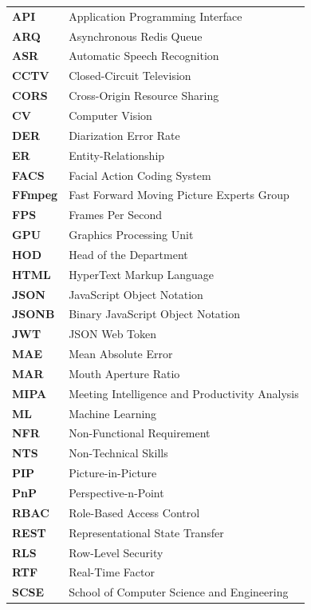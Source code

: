 \documentclass[12pt,a4paper,oneside]{report}
\begin{document}
\begin{longtable}{@{}p{3.0cm}p{11.0cm}@{}}
\textbf{API}     & Application Programming Interface \\
\textbf{ARQ}     & Asynchronous Redis Queue \\
\textbf{ASR}     & Automatic Speech Recognition \\
\textbf{CCTV}    & Closed-Circuit Television \\
\textbf{CORS}    & Cross-Origin Resource Sharing \\
\textbf{CV}      & Computer Vision \\
\textbf{DER}     & Diarization Error Rate \\
\textbf{ER}      & Entity-Relationship \\
\textbf{FACS}    & Facial Action Coding System \\
\textbf{FFmpeg}  & Fast Forward Moving Picture Experts Group \\
\textbf{FPS}     & Frames Per Second \\
\textbf{GPU}     & Graphics Processing Unit \\
\textbf{HOD}     & Head of the Department \\
\textbf{HTML}    & HyperText Markup Language \\
\textbf{JSON}    & JavaScript Object Notation \\
\textbf{JSONB}   & Binary JavaScript Object Notation \\
\textbf{JWT}     & JSON Web Token \\
\textbf{MAE}     & Mean Absolute Error \\
\textbf{MAR}     & Mouth Aperture Ratio \\
\textbf{MIPA}    & Meeting Intelligence and Productivity Analysis \\
\textbf{ML}      & Machine Learning \\
\textbf{NFR}     & Non-Functional Requirement \\
\textbf{NTS}     & Non-Technical Skills \\
\textbf{PIP}     & Picture-in-Picture \\
\textbf{PnP}     & Perspective-n-Point \\
\textbf{RBAC}    & Role-Based Access Control \\
\textbf{REST}    & Representational State Transfer \\
\textbf{RLS}     & Row-Level Security \\
\textbf{RTF}     & Real-Time Factor \\
\textbf{SCSE}    & School of Computer Science and Engineering \\

\end{longtable}
\end{document}
